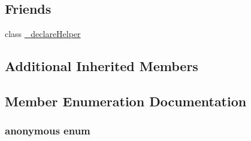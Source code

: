 \subsection*{Friends}
\begin{DoxyCompactItemize}
\item 
class \hyperlink{classperf_1_1TestBase_aac6d781fcc79b1daa0c48d37d837bd64}{\-\_\-declare\-Helper}
\end{DoxyCompactItemize}
\subsection*{Additional Inherited Members}


\subsection{Member Enumeration Documentation}
\hypertarget{classperf_1_1TestBase_ac5e0802870e938aef3c7eca288eaa57e}{\subsubsection[{anonymous enum}]{\setlength{\rightskip}{0pt plus 5cm}anonymous enum\hspace{0.3cm}{\ttfamily [protected]}}}\label{classperf_1_1TestBase_ac5e0802870e938aef3c7eca288eaa57e}
